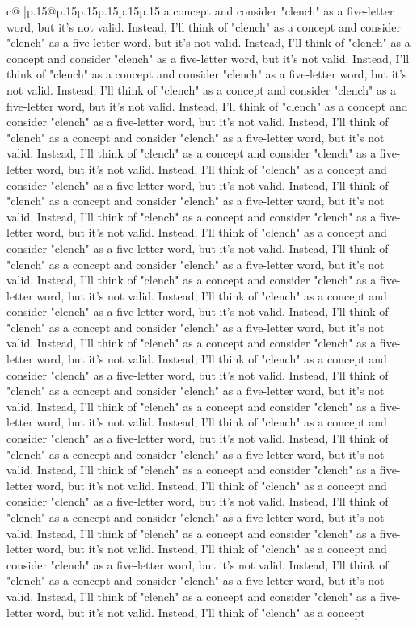 \documentclass{article}
\begin{document}
{\begin{supertabular}{c@{$\;$}|p{.15\linewidth}@{}p{.15\linewidth}p{.15\linewidth}p{.15\linewidth}p{.15\linewidth}p{.15\linewidth}}
{{{a concept and consider "clench" as a five-letter word, but it's not valid. Instead, I'll think of "clench" as a concept and consider "clench" as a five-letter word, but it's not valid. Instead, I'll think of "clench" as a concept and consider "clench" as a five-letter word, but it's not valid. Instead, I'll think of "clench" as a concept and consider "clench" as a five-letter word, but it's not valid. Instead, I'll think of "clench" as a concept and consider "clench" as a five-letter word, but it's not valid. Instead, I'll think of "clench" as a concept and consider "clench" as a five-letter word, but it's not valid. Instead, I'll think of "clench" as a concept and consider "clench" as a five-letter word, but it's not valid. Instead, I'll think of "clench" as a concept and consider "clench" as a five-letter word, but it's not valid. Instead, I'll think of "clench" as a concept and consider "clench" as a five-letter word, but it's not valid. Instead, I'll think of "clench" as a concept and consider "clench" as a five-letter word, but it's not valid. Instead, I'll think of "clench" as a concept and consider "clench" as a five-letter word, but it's not valid. Instead, I'll think of "clench" as a concept and consider "clench" as a five-letter word, but it's not valid. Instead, I'll think of "clench" as a concept and consider "clench" as a five-letter word, but it's not valid. Instead, I'll think of "clench" as a concept and consider "clench" as a five-letter word, but it's not valid. Instead, I'll think of "clench" as a concept and consider "clench" as a five-letter word, but it's not valid. Instead, I'll think of "clench" as a concept and consider "clench" as a five-letter word, but it's not valid. Instead, I'll think of "clench" as a concept and consider "clench" as a five-letter word, but it's not valid. Instead, I'll think of "clench" as a concept and consider "clench" as a five-letter word, but it's not valid. Instead, I'll think of "clench" as a concept and consider "clench" as a five-letter word, but it's not valid. Instead, I'll think of "clench" as a concept and consider "clench" as a five-letter word, but it's not valid. Instead, I'll think of "clench" as a concept and consider "clench" as a five-letter word, but it's not valid. Instead, I'll think of "clench" as a concept and consider "clench" as a five-letter word, but it's not valid. Instead, I'll think of "clench" as a concept and consider "clench" as a five-letter word, but it's not valid. Instead, I'll think of "clench" as a concept and consider "clench" as a five-letter word, but it's not valid. Instead, I'll think of "clench" as a concept and consider "clench" as a five-letter word, but it's not valid. Instead, I'll think of "clench" as a concept and consider "clench" as a five-letter word, but it's not valid. Instead, I'll think of "clench" as a concept and consider "clench" as a five-letter word, but it's not valid. Instead, I'll think of "clench" as a concept and consider "clench" as a five-letter word, but it's not valid. Instead, I'll think of "clench" as a concept and consider "clench" as a five-letter word, but it's not valid. Instead, I'll think of "clench" as a concept }}}
\end{supertabular}}
\end{document}
